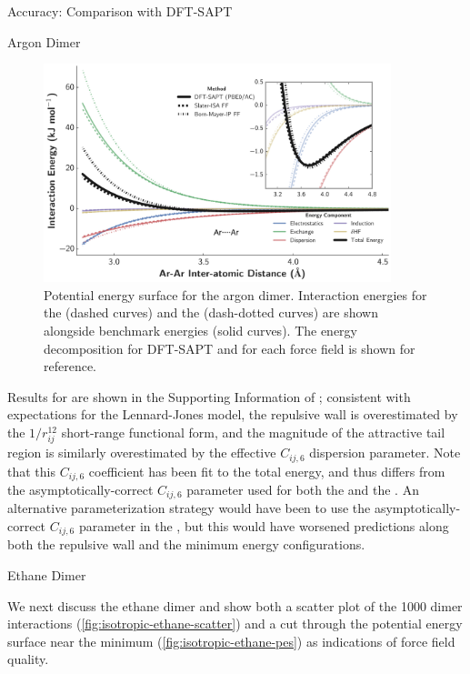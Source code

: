 \begin{subsection}{Accuracy: Comparison with DFT-SAPT}
\begin{subsubsection}{Argon Dimer}
    \begin{figure}
    \includegraphics[width=0.9\textwidth]{isotropic/ar_ar_pes.pdf}
    \caption{
    Potential energy surface for the argon dimer. 
    Interaction energies for the \isaffold (dashed curves) and the \saptff (dash-dotted
    curves) are shown alongside benchmark \saptpbeo energies (solid curves). The
    energy decomposition for DFT-SAPT and for each force field is shown for reference.
    }
    \label{fig:isotropic-ar-pes}
    \end{figure}

Results for \ljff are shown in the Supporting Information of
; consistent with expectations for the
Lennard-Jones model, the repulsive wall is overestimated by the
$1/r_{ij}^{12}$ short-range functional form, and the magnitude of the
attractive tail region is similarly overestimated by the effective $C_{ij,6}$
dispersion parameter. 
%
Note that this $C_{ij,6}$ coefficient has been fit to the total energy, and thus differs
from the asymptotically-correct $C_{ij,6}$ parameter used for both the \isaffold
and the \saptff. 
An alternative parameterization strategy would have been to use the asymptotically-correct $C_{ij,6}$
parameter in the \ljff, but this would have worsened predictions
along both the repulsive wall and the
minimum energy configurations.


\end{subsubsection}
\begin{subsubsection}{Ethane Dimer}


We next discuss the ethane dimer and show both a scatter plot
of the 1000 dimer interactions (\cref{fig:isotropic-ethane-scatter}) and a cut through the
potential energy surface near the minimum (\cref{fig:isotropic-ethane-pes}) as
indications of force field quality.


\end{subsubsection}
\end{subsection}

